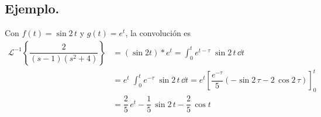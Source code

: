 \subsection*{Ejemplo.}
Con $f(t) = \sin 2 \, t$ y $g(t) = e^{t}$, la convolución es
\begin{align*}
\mathscr{L}^{-1} \left\{ \dfrac{2}{(s-1)(s^{2} + 4)} \right\} &= (\sin 2t) * e^{t} = \int_{0}^{t} e^{t - \tau} \; \sin 2 \, t \, \dd t \\
&= e^{t} \; \int_{0}^{t} e^{-\tau} \; \sin 2 \, t \, \dd t = e^{t} \left[ \dfrac{e^{-\tau}}{5} (- \sin 2 \, \tau - 2 \, \cos 2 \, \tau) \right]_{0}^{t} \\
&= \dfrac{2}{5} \, e^{t} - \dfrac{1}{5} \, \sin 2 \, t - \dfrac{2}{5} \, \cos t
\end{align*}
